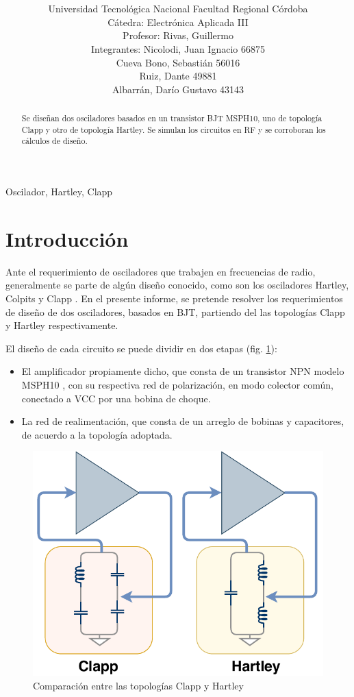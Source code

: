 \documentclass[journal]{IEEEtran}
\title{
    }
\author{ 
    Universidad Tecnológica Nacional 
    Facultad Regional Córdoba \\
    C\'atedra: Electrónica Aplicada III \\
    Profesor: Rivas, Guillermo \\
    Integrantes: Nicolodi, Juan Ignacio   66875 \\
    Cueva Bono, Sebastián    56016 \\
    Ruiz, Dante   49881 \\
    Albarrán, Darío Gustavo  43143 \\
    }
\date{}
\begin{document}
\maketitle

\begin{abstract} Se diseñan dos osciladores basados en un transistor BJT MSPH10, uno de topología Clapp y otro de topología Hartley. Se simulan los circuitos en RF y se corroboran los cálculos de diseño.

\end{abstract}

\begin{IEEEkeywords}
Oscilador, Hartley, Clapp
\end{IEEEkeywords}

\section*{Introducción}
Ante el requerimiento de osciladores que trabajen en frecuencias de radio, generalmente se parte de algún diseño conocido, como son los osciladores Hartley, Colpits y Clapp \cite{randall}. En el presente informe, se pretende resolver los requerimientos de diseño de dos osciladores, basados en BJT, partiendo del las topologías Clapp y Hartley respectivamente.

El diseño de cada circuito se puede dividir en dos etapas (fig. \ref{diag01}):
\begin{itemize}
\item El amplificador propiamente dicho, que consta de un transistor NPN modelo MSPH10 \cite{MPSH10}, con su respectiva red de polarización, en modo colector común, conectado a VCC por una bobina de choque.
\item La red de realimentación, que consta de un arreglo de bobinas y capacitores, de acuerdo a la topología adoptada.
\end{itemize}

\begin{figure}[H]
\centering
\includegraphics[width=.8\linewidth]{img/clapp_hartley-1.pdf}
\caption{Comparación entre las topologías Clapp y Hartley}
\label{diag01}
\end{figure}
\end{document}
